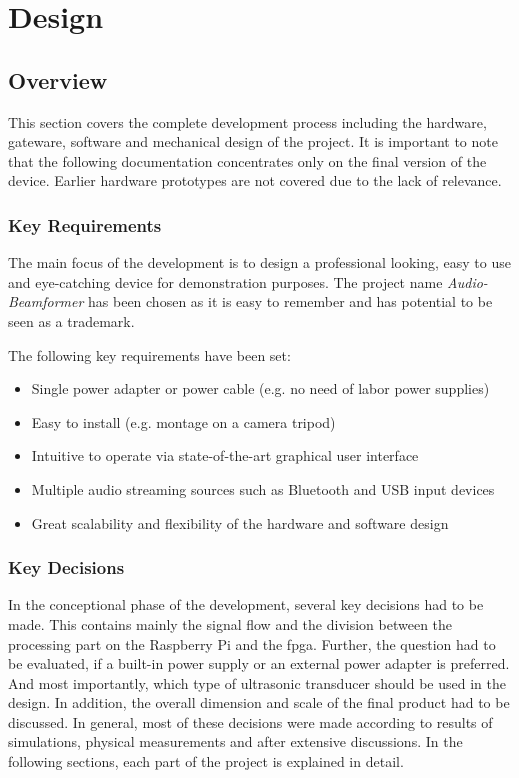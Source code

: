 \chapter{Design}
\section{Overview}
This section covers the complete development process including the hardware, gateware, software and mechanical design of the project. It is important to note that the following documentation concentrates only on the final version of the device. Earlier hardware prototypes are not covered due to the lack of relevance.

\subsection{Key Requirements}
The main focus of the development is to design a professional looking, easy to use and eye-catching device for demonstration purposes. The project name \textit{Audio-Beamformer} has been chosen as it is easy to remember and has potential to be seen as a trademark.

The following key requirements have been set:
\begin{itemize}
  \item Single power adapter or power cable (e.g. no need of labor power supplies)
  \item Easy to install (e.g. montage on a camera tripod)
  \item Intuitive to operate via state-of-the-art graphical user interface
  \item Multiple audio streaming sources such as Bluetooth and USB input devices
  \item Great scalability and flexibility of the hardware and software design
\end{itemize}

\subsection{Key Decisions}
In the conceptional phase of the development, several key decisions had to be made. This contains mainly the signal flow and the division between the processing part on the Raspberry Pi and the \acrshort{fpga}. Further, the question had to be evaluated, if a built-in power supply or an external power adapter is preferred. And most importantly, which type of ultrasonic transducer should be used in the design.
In addition, the overall dimension and scale of the final product had to be discussed.
In general, most of these decisions were made according to results of simulations, physical measurements and after extensive discussions.
In the following sections, each part of the project is explained in detail.



